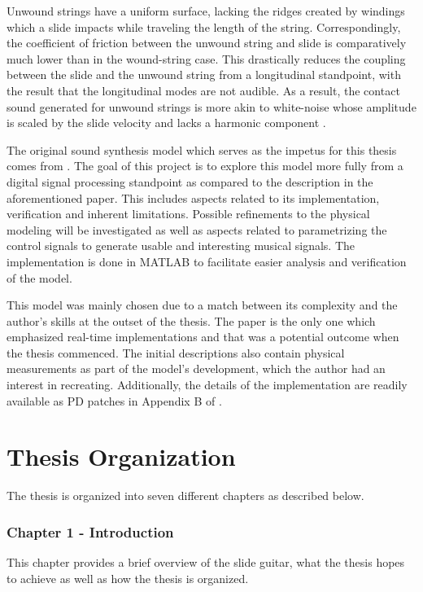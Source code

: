 \documentclass[../main.tex]{subfiles}
\begin{document}
Unwound strings have a uniform surface, lacking the ridges created by windings which a slide impacts while traveling the length of the string. Correspondingly, the coefficient of friction between the unwound string and slide is comparatively much lower than in the wound-string case. This drastically reduces the coupling between the slide and the unwound string from a longitudinal standpoint, with the result that the longitudinal modes are not audible. As a result, the contact sound generated for unwound strings is more akin to white-noise whose amplitude is scaled by the slide velocity and lacks a harmonic component . 

The original sound synthesis model which serves as the impetus for this thesis comes from . The goal of this project is to explore this model more fully from a digital signal processing standpoint as compared to the description in the aforementioned paper. This includes aspects related to its implementation, verification and inherent limitations. Possible refinements to the physical modeling will be investigated as well as aspects related to parametrizing the control signals to generate usable and interesting musical signals. The implementation is done in MATLAB to facilitate easier analysis and verification of the model.

This model was mainly chosen due to a match between its complexity and the author's skills at the outset of the thesis. The paper is the only one which emphasized real-time implementations and that was a potential outcome when the thesis commenced. The initial descriptions also contain physical measurements as part of the model's development, which the author had an interest in recreating. Additionally, the details of the implementation are readily available as PD patches in Appendix B of .

\section{Thesis Organization}
The thesis is organized into seven different chapters as described below.

\subsubsection{Chapter 1 - Introduction}
This chapter provides a brief overview of the slide guitar, what the thesis hopes to achieve as well as how the thesis is organized.
\end{document}
